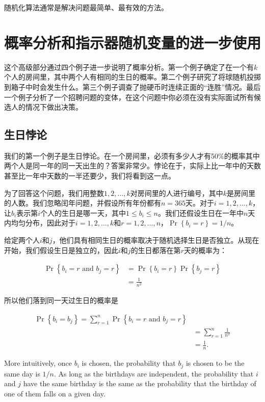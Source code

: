 \documentclass[lang=cn,newtx,10pt,scheme=chinese]{elegantbook}
\begin{document}
随机化算法通常是解决问题最简单、最有效的方法。

\section{概率分析和指示器随机变量的进一步使用}

这个高级部分通过四个例子进一步说明了概率分析。第一个例子确定了在一个有$k$个人的房间里，其中两个人有相同的生日的概率。第二个例子研究了将球随机投掷到箱子中时会发生什么。第三个例子调查了抛硬币时连续正面的“连胜”情况。最后一个例子分析了一个招聘问题的变体，在这个问题中你必须在没有实际面试所有候选人的情况下做出决策。

\subsection{生日悖论}

我们的第一个例子是生日悖论。在一个房间里，必须有多少人才有50\%的概率其中两个人是同一年的同一天出生的？答案非常少。悖论在于，实际上比一年中的天数甚至比一年中天数的一半还要少，我们将看到这一点。

为了回答这个问题，我们用整数$1,2,\ldots,k$对房间里的人进行编号，其中$k$是房间里的人数。我们忽略闰年问题，并假设所有年份都有$n=365$天。对于$i=1,2,\ldots,k$，让$b_i$表示第$i$个人的生日是哪一天，其中$1\leq b_i\leq n$。我们还假设生日在一年中$n$天内均匀分布，因此对于$i=1,2,\ldots,k$和$r=1,2,\ldots,n$，$\operatorname{Pr}\left\{b_i=r\right\}=1/n$。

给定两个人$i$和$j$，他们具有相同生日的概率取决于随机选择生日是否独立。从现在开始，我们假设生日是独立的，因此$i$和$j$的生日都落在第$r$天的概率为：

$$
\begin{aligned}
\operatorname{Pr}\left\{b_i=r \text { and } b_j=r\right\} & =\operatorname{Pr}\left\{b_i=r\right\} \operatorname{Pr}\left\{b_j=r\right\} \\
& =\frac{1}{n^2}
\end{aligned}
$$

所以他们落到同一天过生日的概率是

$$
\begin{aligned}
\operatorname{Pr}\left\{b_i=b_j\right\}=\sum_{r=1}^n \operatorname{Pr}\left\{b_i=r \text { and } b_j=r\right\} \\
& =\sum_{r=1}^n \frac{1}{n^2} \\
& =\frac{1}{n} .
\end{aligned}
$$

More intuitively, once $b_i$ is chosen, the probability that $b_j$ is chosen to be the same day is $1 / n$. As long as the birthdays are independent, the probability that $i$ and $j$ have the same birthday is the same as the probability that the birthday of one of them falls on a given day.
\end{document}
